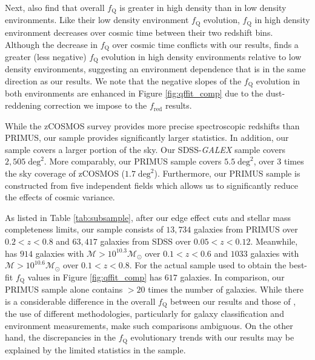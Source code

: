 \documentclass{emulateapj}
\begin{document}
Next, \cite{Kovac:2014aa} also find that overall $f_{\mathrm{Q}}$ is
greater in high density than in low density environments. Like their
low density environment $f_{\mathrm{Q}}$ evolution, $f_{\mathrm{Q}}$ in high
density environment decreases over cosmic time between their two
redshift bins. Although the decrease in $f_{\mathrm{Q}}$ over cosmic time
conflicts with our results, \cite{Kovac:2014aa} finds a greater (less
negative) $f_{\mathrm{Q}}$ evolution in high density environments relative
to low density environments, suggesting an environment dependence that
is in the same direction as our results. We note that the negative
slopes of the $f_{\mathrm{Q}}$ evolution in both environments are enhanced
in Figure \ref{fig:qffit_comp} due to the dust-reddening
correction we impose to the \cite{Kovac:2014aa} $f_{\mathrm{red}}$ results. 


While the zCOSMOS survey provides more precise spectroscopic redshifts than PRIMUS, our sample provides significantly larger statistics. In addition, our sample covers a larger portion of the sky. Our SDSS-{\em GALEX} sample covers $2,505 \;\mathrm{deg}^2$. More comparably, our PRIMUS sample covers $5.5 \;\mathrm{deg}^2$, over 3 times the sky coverage of zCOSMOS ($1.7 \;\mathrm{deg}^2$). Furthermore, our PRIMUS sample is constructed from five independent fields which allows us to significantly reduce the effects of cosmic variance. 

As listed in Table \ref{tab:subsample}, after our edge effect cuts and
stellar mass completeness limits, our sample consists of $13,734$
galaxies from PRIMUS over $0.2< z< 0.8$ and $63,417$ galaxies from
SDSS over $0.05 < z < 0.12$. Meanwhile, \cite{Iovino:2010aa} has $914$
galaxies with $\mathcal{M} > 10^{10.3} \mathcal{M}_{\odot}$ over $0.1
< z < 0.6$ and $1033$ galaxies with $\mathcal{M} > 10^{10.6}
\mathcal{M}_{\odot}$ over $0.1 < z < 0.8$. For the actual sample used
to obtain the best-fit $f_{\mathrm{Q}}$ values in Figure
\ref{fig:qffit_comp} \cite{Iovino:2010aa} has $617$ galaxies. In
comparison, our PRIMUS sample alone contains $> 20$ times the number
of galaxies. While there is a considerable difference in the overall
$f_{\mathrm{Q}}$ between our results and those of \cite{Iovino:2010aa},
the use of different methodologies, particularly for galaxy
classification and environment measurements, make such comparisons
ambiguous. On the other hand, the discrepancies in the $f_{\mathrm{Q}}$
evolutionary trends with our results may be explained by the limited
statistics in the \cite{Iovino:2010aa} sample.
\end{document}
